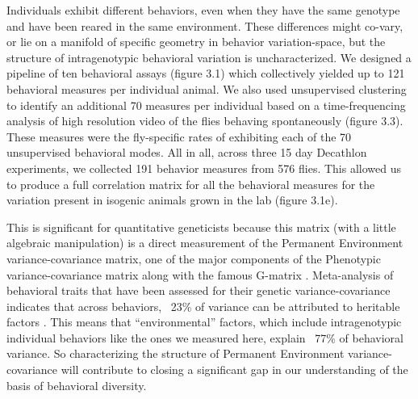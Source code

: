 \documentclass[12pt,letterpaper]{article}
\begin{document}
Individuals exhibit different behaviors, even when they have the same genotype and have been reared in the same environment. These differences might co-vary, or lie on a manifold of specific geometry in behavior variation-space, but the structure of intragenotypic behavioral variation is uncharacterized. We designed a pipeline of ten behavioral assays (figure 3.1) which collectively yielded up to 121 behavioral measures per individual animal. We also used unsupervised clustering to identify an additional 70 measures per individual based on a time-frequencing analysis of high resolution video of the flies behaving spontaneously (figure 3.3). These measures were the fly-specific rates of exhibiting each of the 70 unsupervised behavioral modes. All in all, across three 15 day Decathlon experiments, we collected 191 behavior measures from 576 flies. This allowed us to produce a full correlation matrix for all the behavioral measures for the variation present in isogenic animals grown in the lab (figure 3.1e). 

This is significant for quantitative geneticists because this matrix (with a little algebraic manipulation) is a direct measurement of the Permanent Environment variance-covariance matrix, one of the major components of the Phenotypic variance-covariance matrix along with the famous G-matrix \cite{Charmantier_Quantitative_2014}. Meta-analysis of behavioral traits that have been assessed for their genetic variance-covariance indicates that across behaviors, ~23\% of variance can be attributed to heritable factors \cite{Dochtermann_The_2019}. This means that “environmental” factors, which include intragenotypic individual behaviors like the ones we measured here, explain ~77\% of behavioral variance. So characterizing the structure of Permanent Environment variance-covariance will contribute to closing a significant gap in our understanding of the basis of behavioral diversity.
\end{document}
